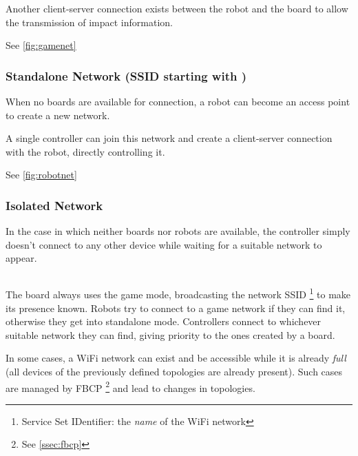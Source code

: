   Another client-server connection exists between the robot and the
  board to allow the transmission of impact information.

  See \autoref{fig:gamenet}

\subsubsection{Standalone Network (SSID starting with
  )}
  When no boards are available for connection, a robot can become an
  access point to create a new network.

  A single controller can join this network and create a
  client-server connection with the robot, directly controlling it.
  
  See \autoref{fig:robotnet}

\subsubsection{Isolated Network}
  In the case in which neither boards nor robots are available, the
  controller simply doesn't connect to any other device while
  waiting for a suitable network to appear.

\subsection*{}
The board always uses the game mode, broadcasting the network SSID%
\footnote{Service Set IDentifier: the \textit{name} of the WiFi
network} to make its presence known. Robots try to connect to a game
network if they can find it, otherwise they get into standalone
mode. Controllers connect to whichever suitable network they can
find, giving priority to the ones created by a board.

In some cases, a WiFi network can exist and be accessible while it
is already \textit{full} (all devices of the previously defined
topologies are already present). Such cases are managed by FBCP%
\footnote{See \autoref{ssec:fbcp}} and lead to changes in topologies.

